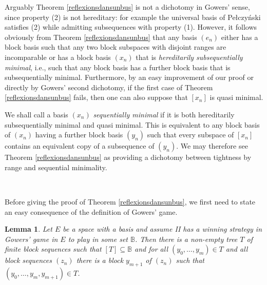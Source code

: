 \documentclass[10pt]{amsart}
\numberwithin{equation}{section}
\newtheorem{lemme}[thm]{Lemma}
\begin{document}
Arguably Theorem \ref{reflexionsdansunbus} is not  a dichotomy in Gowers'
sense, since property (2) is not hereditary: for example the universal basis of
Pe\l czy\'nski \cite{pe} satisfies (2) while admitting subsequences with
property (1). However, it follows obviously from Theorem
\ref{reflexionsdansunbus} that any basis $(e_n)$ either has a block basis such
that any two block subspaces with disjoint ranges are incomparable or has a
block basis $(x_n)$ that is {\em hereditarily subsequentially minimal}, i.e.,
such that any block basis has a further block basis that is subsequentially
minimal. Furthermore, by an easy improvement of our proof or directly by
Gowers' second dichotomy, if the first case of Theorem
\ref{reflexionsdansunbus} fails, then one can also suppose that $[x_n]$ is
quasi minimal.

We shall call a basis $(x_n)$ {\em sequentially minimal} if  it is both
hereditarily subsequentially minimal and quasi minimal. This is  equivalent to
any block basis of $(x_n)$  having a further block basis   $(y_n)$ such
that every subspace of $[x_n]$ contains an equivalent copy of a subsequence of $(y_n)$.
We may therefore see Theorem \ref{reflexionsdansunbus} as providing a
dichotomy between tightness by range and sequential minimality.

\

Before giving the proof of Theorem \ref{reflexionsdansunbus}, we first need to
state an easy consequence of the definition of Gowers' game.

\begin{lemme}\label{independence of I}
Let $E$ be a space with a basis and assume II has a winning strategy in Gowers'
game in $E$ to play in some set ${\mathbb B}$. Then there is a non-empty tree $T$ of
finite block sequences such that $[T]\subseteq {\mathbb B}$ and for all
$(y_0,\ldots,y_m)\in T$ and all block sequences $(z_n)$ there is a block
$y_{m+1}$ of $(z_n)$ such that $(y_0,\ldots,y_m, y_{m+1})\in T$.
\end{lemme}
\end{document}
